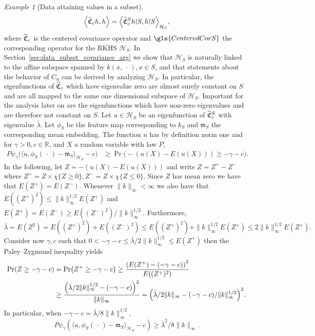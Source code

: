 \documentclass[AHL,Unicode,longabstracts,published]{cedram}
\theoremstyle{remark}
\newtheorem{examl}{Example}
\newcommand{\restrr}
{\!\!\upharpoonright\!\!}
\newcommand{\R}{\mathbb{R}}
\newcommand{\cH}{\mathcal{H}}
\newcommand{\fkC}{\mathfrak{C}}
\newcommand{\mean}{\mathfrak{m}}
\let\oldtilde\tilde
\renewcommand*{\tilde}[1]{\mathchoice{\widetilde{#1}}{\widetilde{#1}}{\oldtilde{#1}}{\oldtilde{#1}}}
\let\originalleft\left
\let\originalright\right
\renewcommand{\left}{\mathopen{}\mathclose\bgroup\originalleft}
\renewcommand{\right}{\aftergroup\egroup\originalright}
\begin{document}
\begin{examl}[{Data attaining values in a subset}]
\[
\left\langle \tilde{\fkC}_c h,h \right\rangle = \left\langle \tilde{\fkC}^S_c h\restrr S, h\restrr S\right\rangle_{\cH_S},
\]
where $\tilde{\fkC}_c$ is the centered covariance operator and $\gls{CenteredCovS}$ the corresponding operator for the RKHS $\cH_S$. In Section~\ref{sec:data_subset_covariance_arg} we show that $\cH_S$ is naturally linked to the affine subspace spanned by $k(x,\,\cdot\,), x\in S$, and that statements about the behavior of $C_n$ can be derived by analyzing $\cH_S$. In particular, the eigenfunctions of $\tilde{\fkC}_c$ which have eigenvalue zero are almost surely constant on $S$ and are all mapped to the same one dimensional subspace of $\cH_S$. Important for the analysis later on are the eigenfunctions which have non-zero eigenvalues and are therefore not constant on $S$. Let $u \in \cH_S$ be an eigenfunction of $\tilde{\fkC}_c^S$ with eigenvalue $\bar \lambda$. Let $\phi_S$ be the feature map corresponding to $k_S$ and $\mean_S$ the corresponding mean embedding. The function $u$ has by definition norm one and for $\gamma > 0, c \in \R$, and $X$ a random variable with law $P$,
\begin{align*}
P\psi_\gamma\bigl(\langle u,\phi_S(\,\cdot\,) - \mean_S \rangle_{\cH_S} -c\bigr) &
\geq \Pr\bigl(- (u(X) - E(u(X))) \geq - \gamma - c\bigr).
\end{align*}
In the following, let $Z = - (u(X) - E(u(X)))$ and write $Z = Z^+ - Z^-$ where $Z^+ = Z \times \chi\{Z \geq 0\}, Z^-= Z \times \chi\{Z \leq 0\}$. Since $Z$ has mean zero we have that $E(Z^+) = E(Z^-)$. Whenever $\|k\|_\infty < \infty$ we also have that $E((Z^+)^2) \leq \|k\|_\infty^{1/2} E(Z^+)$ and $E(Z^+) = E(Z^-) \geq E((Z^-)^2) / \|k\|_\infty^{1/2}$. Furthermore,
\[
\bar \lambda = E(Z^2) = E((Z^+)^2) + E((Z^-)^2) \leq E((Z^+)^2) + \|k\|_\infty^{1/2} E(Z^+) \leq 2 \|k\|_\infty^{1/2} E(Z^+).
\]
Consider now $\gamma,c$ such that $ 0 < -\gamma -c \leq \bar \lambda /2 \|k\|_\infty^{1/2}
\leq E(Z^+)$ then the Paley--Zygmund inequality yields
\begin{align*}
\Pr(Z \geq -\gamma - c) &= \Pr\left(Z^+ \geq -\gamma -c\right) \geq \frac{\left(E(Z^+) - (-\gamma -c)\right)^2}{E\left((Z^+)^2\right)} \\
&\geq \frac{\left(\bar \lambda/2 \|k\|_\infty^{1/2} - (-\gamma -c)\right)^2}{\|k\|_\infty} = \left(\bar \lambda/2 \|k\|_\infty - (-\gamma -c)/\|k\|_\infty^{1/2}\right)^2.
\end{align*}
In particular, when $-\gamma -c = \bar \lambda /8\|k\|_\infty^{1/2}$,
\begin{equation}\label{eq:lbnd_P_cov}
P\psi_\gamma(\langle u,\phi_S(\,\cdot\,) - \mean_S \rangle_{\cH_S} -c)
\geq \bar \lambda^2/8\|k\|_\infty.
\end{equation}
\end{examl}
\end{document}

